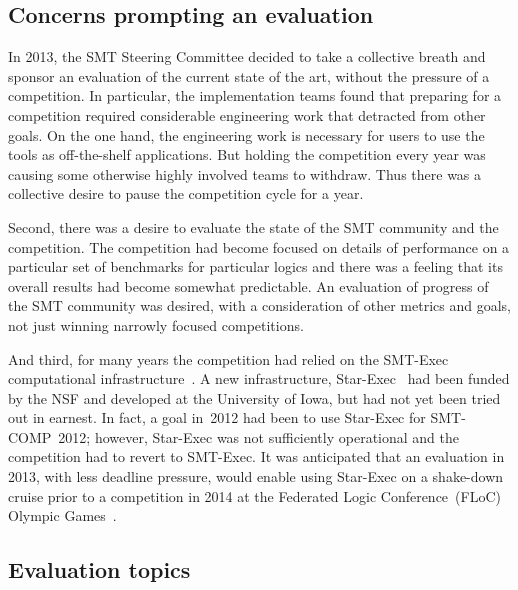 \documentclass[smallcondensed]{svjour3}
\begin{document}
\subsection{Concerns prompting an evaluation}

In 2013, the SMT Steering Committee decided to take a collective breath and sponsor an evaluation of the current state of the art, without the pressure of a competition. In particular, the implementation teams found that preparing for a competition required considerable engineering work that detracted from other goals. On the one hand, the engineering work is necessary for users to use the tools as off-the-shelf applications. But holding the competition every year was causing some otherwise highly involved teams to withdraw. Thus there was a collective desire to pause the competition cycle for a year.

Second, there was a desire to evaluate the state of the SMT community and the competition. The competition had become focused on details of performance on a particular set of benchmarks for particular logics and there was a feeling that its overall results had become somewhat predictable. An evaluation of progress of the SMT community was desired, with a consideration of other metrics and goals, not just winning narrowly focused competitions.
 
And third, for many years the competition had relied on the SMT-Exec computational infrastructure~\cite{springerlink:10.1007/s10817-012-9246-5}.  A new infrastructure, Star-Exec~\cite{StuST-IJCAR-14,webStarExec} had been funded by the NSF and developed at the University of Iowa, but had not yet been tried out in earnest.  In fact, a goal in~2012 had been to use Star-Exec for SMT-COMP~2012; however, Star-Exec was not sufficiently operational and the competition had to revert to SMT-Exec.  It was anticipated that an evaluation in 2013, with less deadline pressure, would enable using Star-Exec on a shake-down cruise prior to a competition in 2014 at the Federated Logic Conference~(FLoC) Olympic Games~\cite{webOlympicGames}.

\subsection{Evaluation topics}
\end{document}
